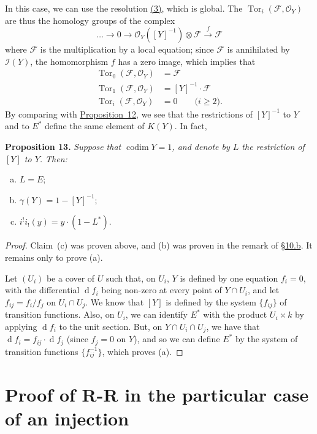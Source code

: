 \documentclass{article}
\newenvironment{itenv}[1]
  {\phantomsection\par\medskip\noindent\textbf{#1.}\itshape}
  {\medskip}
\newcommand{\scr}[1]{{\mathscr{#1}}}
\newcommand{\dd}{\operatorname{d}\!}
\renewcommand{\geq}{\geqslant}
\DeclareMathOperator{\Tor}{Tor}
\DeclareMathOperator{\codim}{codim}
\newcommand{\oldpage}[1]{\marginpar{\footnotesize$\Big\vert$ \textit{p.~#1}}}
\begin{document}
In this case, we can use the resolution \hyperref[equation3]{(3)}, which is global.
The $\Tor_i(\scr{F},\scr{O}_Y)$ are thus the homology groups of the complex
\[
  \ldots \to 0 \to \scr{O}_Y([Y]^{-1})\otimes\scr{F} \xrightarrow{f}\scr{F}
\]
where $\scr{F}$ is the multiplication by a local equation;
since $\scr{F}$ is annihilated by $\scr{I}(Y)$, the homomorphism $f$ has a zero image, which implies that
\begin{align*}
  \Tor_0(\scr{F},\scr{O}_Y) &= \scr{F}
\\\Tor_1(\scr{F},\scr{O}_Y) &= [Y]^{-1}\cdot\scr{F}
\\\Tor_i(\scr{F},\scr{O}_Y) &= 0 \qquad\mbox{($i\geq2$).}
\end{align*}
By comparing with \hyperref[proposition12]{Proposition~12}, we see that the restrictions of $[Y]^{-1}$ to $Y$ and to $E^*$ define the same element of $K(Y)$.
In fact,
\begin{itenv}{Proposition 13}
\label{proposition13}
  Suppose that $\codim Y=1$, and denote by $L$ the restriction of $[Y]$ to $Y$.
  Then:
  \begin{enumerate}[(a)]
    \item $L=E$;
    \item $\gamma(Y) = 1-[Y]^{-1}$;
    \item $i^!i_!(y) = y\cdot(1-L^*).$
  \end{enumerate}
\end{itenv}

\begin{proof}
\oldpage{124}
  Claim~(c) was proven above, and (b) was proven in the remark of \hyperref[subsection10b]{\S10.b}.
  It remains only to prove (a).

  Let $(U_i)$ be a cover of $U$ such that, on $U_i$, $Y$ is defined by one equation $f_i=0$, with the differential $\dd f_i$ being non-zero at every point of $Y\cap U_i$, and let $f_{ij}=f_i/f_j$ on $U_i\cap U_j$.
  We know that $[Y]$ is defined by the system $\{f_{ij}\}$ of transition functions.
  Also, on $U_i$, we can identify $E^*$ with the product $U_i\times k$ by applying $\dd f_i$ to the unit section.
  But, on $Y\cap U_i\cap U_j$, we have that $\dd f_i=f_{ij}\cdot\dd f_j$ (since $f_j=0$ on $Y$), and so we can define $E^*$ by the system of transition functions $\{f_{ij}^{-1}\}$, which proves (a).
\end{proof}


\section{Proof of R-R in the particular case of an injection}
\label{section11}
\end{document}
